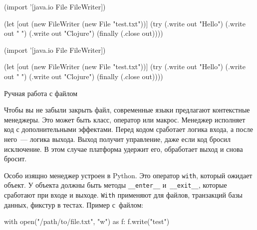 \begin{listing}[ht!]

\ifx\DEVICETYPE\MOBILE

\begin{english}
  \begin{clojure}
(import '[java.io File FileWriter])

(let [out (new FileWriter
            (new File "test.txt"))]
  (try
    (.write out "Hello")
    (.write out " ")
    (.write out "Clojure")
    (finally
      (.close out))))
  \end{clojure}
\end{english}

\else

\begin{english}
  \begin{clojure}
(import '[java.io File FileWriter])

(let [out (new FileWriter (new File "test.txt"))]
  (try
    (.write out "Hello")
    (.write out " ")
    (.write out "Clojure")
    (finally
      (.close out))))
  \end{clojure}
\end{english}

\fi

\caption{Ручная работа с файлом}
\label{fig:write-file}

\end{listing}

Чтобы вы не забыли закрыть файл, современные языки предлагают контекстные
менеджеры. Это может быть класс, оператор или макрос. Менеджер исполняет код с
дополнительными эффектами. Перед кодом сработает логика входа, а после него~---
логика выхода. Выход получит управление, даже если код бросил исключение. В этом
случае платформа удержит его, обработает выход и снова бросит.


Особо изящно менеджер устроен в Python. Это оператор \verb|with|, который
ожидает объект. У объекта должны быть методы \verb|__enter__|
и~\verb|__exit__|, которые сработают при входе и выходе. \verb|With|
применяют для файлов, транзакций базы данных, фикстур в тестах. Пример с~файлом:


\begin{english}
  \begin{python}
with open("/path/to/file.txt", "w") as f:
    f.write("test")
  \end{python}
\end{english}

